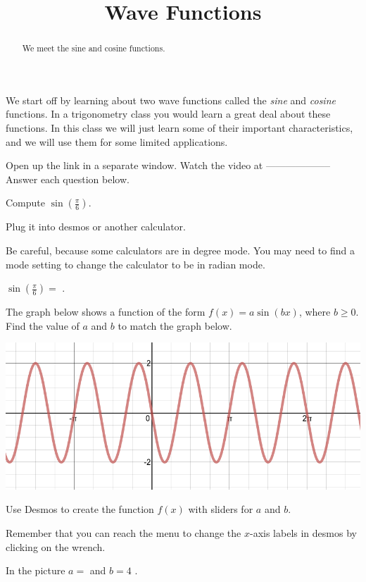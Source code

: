\documentclass{ximera}
\title{Wave Functions}
\begin{document}
\begin{abstract}
We meet the sine and cosine functions.
\end{abstract}
\maketitle


We start off by learning about two wave functions called the \emph{sine} and \emph{cosine} functions. In a trigonometry class you would learn a great deal about these functions. In this class we will just learn some of their important characteristics, and we will use them for some limited applications.

Open up the link  in a separate window. Watch the video at  -------------------- Answer each question below.

\begin{exercise}
Compute $\sin\left(\frac{\pi}{6}\right)$.
\begin{solution} 
\begin{hint}
Plug it into desmos or another calculator. 
\end{hint}
\begin{hint}
Be careful, because some calculators are in degree mode. You may need to find a mode setting to change the calculator to be in radian mode.
\end{hint}
$\sin\left(\frac{\pi}{6}\right)=$ .
\end{solution}
\end{exercise}

\begin{question}
The graph below shows a function of the form $f(x)=a\sin(bx)$, where $b\ge0$. Find the value of $a$ and $b$ to match the graph below.
\begin{image}
\includegraphics{ParentFunctions2/MoreParentFunctions/mysterysine.png}
\end{image}
\begin{solution}
\begin{hint}
Use Desmos to create the function $f(x)$ with sliders for $a$ and $b$. 
\end{hint}
\begin{hint}
Remember that you can reach the menu to change the $x$-axis labels in desmos by clicking on the wrench.
\end{hint}
In the picture $a=$  and $b=4$ .
\end{solution}
\end{question}
\end{document}
